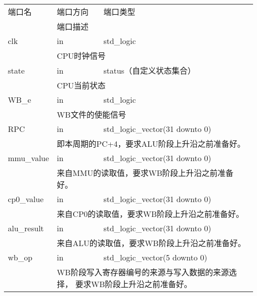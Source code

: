         \begin{tabularx}{\textwidth}{lll}
            \toprule
            端口名          & 端口方向  & 端口类型 \\
            \cmidrule(l){2-3}
            &
            \multicolumn{2}{X}{端口描述} \\
            \midrule
            clk             & in        & std\_logic \\
            \cmidrule(l){2-3}
            &
            \multicolumn{2}{X}{
                CPU时钟信号
            } \\
            \midrule
            state           & in        & status（自定义状态集合） \\
            \cmidrule(l){2-3}
            &
            \multicolumn{2}{X}{
                CPU当前状态
            } \\
            WB\_e           & in        & std\_logic \\
            \cmidrule(l){2-3}
            &
            \multicolumn{2}{X}{
                WB文件的使能信号
            } \\
            \midrule
            RPC             & in        & std\_logic\_vector(31 downto 0) \\
            \cmidrule(l){2-3}
            &
            \multicolumn{2}{X}{
                即本周期的PC+4，要求ALU阶段上升沿之前准备好。
            } \\
            \midrule
            mmu\_value      & in        & std\_logic\_vector(31 downto 0) \\
            \cmidrule(l){2-3}
            &
            \multicolumn{2}{X}{
                来自MMU的读取值，要求WB阶段上升沿之前准备好。
            } \\
            \midrule
            cp0\_value      & in        & std\_logic\_vector(31 downto 0) \\
            \cmidrule(l){2-3}
            &
            \multicolumn{2}{X}{
                来自CP0的读取值，要求WB阶段上升沿之前准备好。
            } \\
            \midrule
            alu\_result     & in        & std\_logic\_vector(31 downto 0) \\
            \cmidrule(l){2-3}
            &
            \multicolumn{2}{X}{
                来自ALU的读取值，要求WB阶段上升沿之前准备好。
            } \\
            \midrule
            wb\_op          & in        & std\_logic\_vector(5 downto 0) \\
            \cmidrule(l){2-3}
            &
            \multicolumn{2}{X}{
                WB阶段写入寄存器编号的来源与写入数据的来源选择，%
                要求WB阶段上升沿之前准备好。

}
\end{tabularx}
